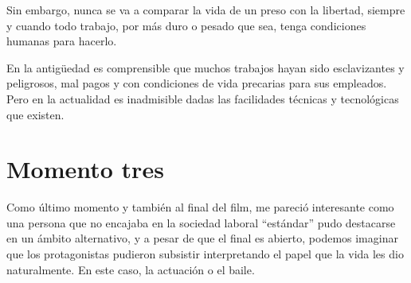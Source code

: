 \documentclass[a4paper, 12pt]{article}
\begin{document}
Sin embargo, nunca se va a comparar la vida de un preso con la libertad, siempre y cuando todo trabajo, por más duro o 
pesado que sea, tenga condiciones humanas para hacerlo.

En la antigüedad es comprensible que muchos trabajos hayan sido esclavizantes y peligrosos, mal pagos y con condiciones 
de vida precarias para sus empleados. Pero en la actualidad es inadmisible dadas las facilidades técnicas y tecnológicas 
que existen.

\section{Momento tres}
Como último momento y también al final del film, me pareció interesante como una persona que no encajaba en la sociedad 
laboral ``estándar'' pudo destacarse en un ámbito alternativo, y a pesar de que el final es abierto, podemos imaginar 
que los protagonistas pudieron subsistir interpretando el papel que la vida les dio naturalmente. En este caso, la actuación
o el baile.
\end{document}

